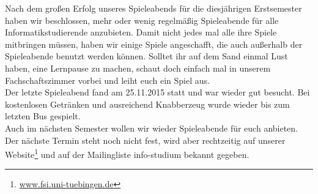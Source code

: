 Nach dem großen Erfolg unseres Spieleabends für die diesjährigen Erstsemester haben wir beschlossen, mehr oder wenig regelmäßig Spieleabende für alle Informatikstudierende anzubieten. Damit nicht jedes mal alle ihre Spiele mitbringen müssen, haben wir einige Spiele angeschafft, die auch außerhalb der Spieleabende benutzt werden können. Solltet ihr auf dem Sand einmal Lust haben, eine Lernpause zu machen, schaut doch einfach mal in unserem Fachschaftszimmer vorbei und leiht euch ein Spiel aus.\\
Der letzte Spieleabend fand am 25.11.2015 statt und war wieder gut besucht. Bei kostenlosen Getränken und ausreichend Knabberzeug wurde wieder bis zum letzten Bus gespielt.\\
Auch im nächsten Semester wollen wir wieder Spieleabende für euch anbieten. Der nächste Termin steht noch nicht fest, wird aber rechtzeitig auf unserer Website\footnote{\url{www.fsi.uni-tuebingen.de}} und auf der Mailingliste info-studium bekannt gegeben.
